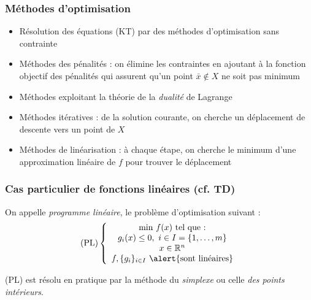 \documentclass{beamer}
\newcommand{\R}{{\ensuremath\mathbb{R}}}
\begin{document}
\begin{frame}
  \frametitle{Méthodes d'optimisation}

  \begin{itemize}
  \item Résolution des équations (KT) par des méthodes d'optimisation sans contrainte
  \item Méthodes des pénalités : on élimine les contraintes en ajoutant à la fonction objectif des pénalités qui assurent
    qu'un point $\bar{x} \notin X$ ne soit pas minimum   
  \item Méthodes exploitant la théorie de la \emph{dualité} de Lagrange
  \item Méthodes itératives : de la solution courante, on cherche un déplacement de descente vers un point de $X$
  \item Méthodes de linéarisation : à chaque étape, on cherche le minimum d'une approximation linéaire de $f$ pour trouver le
    déplacement 
  \end{itemize}
  
\end{frame}

\begin{frame}
  \frametitle{Cas particulier de fonctions linéaires (cf. TD)}

  On appelle \emph{programme linéaire}, le problème d'optimisation
  suivant : 
  \[
  \text{(PL)} \left\{
  \begin{array}{c}
    \text{min} \ f(x) \ \text{tel que :} \\
    g_i(x) \leq 0, \ i \in I = \{1, \dots, m\} \\
    x \in \R^n \\
    f, \{g_i\}_{i \in I} \ \alert{\text{sont linéaires}} \\
  \end{array}
  \right.
  \]

  (PL) est résolu en pratique par la méthode du \emph{simplexe}
  ou celle \emph{des points intérieurs}.
\end{frame}
\end{document}
